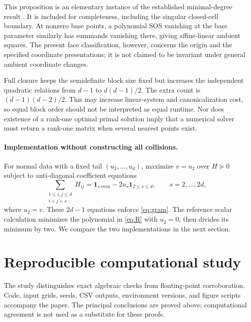 \documentclass[11pt]{article}
\theoremstyle{definition}\newtheorem{definition}[theorem]{Definition}
\theoremstyle{remark}\newtheorem{remark}[theorem]{Remark}
\begin{document}
This proposition is an elementary instance of the established minimal-degree result \cite{bsv,chs}. It is included for completeness, including the singular closed-cell boundary. At nonzero base points, a polynomial SOS vanishing at the base parameter similarly has summands vanishing there, giving affine-linear ambient squares. The present face classification, however, concerns the origin and the specified coordinate presentations; it is not claimed to be invariant under general ambient coordinate changes.

Full closure keeps the semidefinite block size fixed but increases the independent quadratic relations from $d-1$ to $d(d-1)/2$. The extra count is $(d-1)(d-2)/2$. This may increase linear-system and canonicalization cost, so equal block order should not be interpreted as equal runtime. Nor does existence of a rank-one optimal primal solution imply that a numerical solver must return a rank-one matrix when several nearest points exist.

\paragraph{Implementation without constructing all collisions.}
For normal data with a fixed tail $(u_3,\ldots,u_d)$, maximize $v=u_2$ over $H\succeq0$ subject to anti-diagonal coefficient equations
\begin{equation}\label{eq:anti}
 \sum_{\substack{1\le i,j\le d\\i+j=s}}H_{ij}
 =\mathbf1_{s\ \mathrm{even}}-2u_s\mathbf1_{2\le s\le d},\qquad s=2,\ldots,2d,
\end{equation}
where $u_2=v$. These $2d-1$ equations enforce \eqref{eq:gram}. The reference scalar calculation minimizes the polynomial in \eqref{eq:R} with $u_2=0$, then divides its minimum by two. We compare the two implementations in the next section.

\section{Reproducible computational study}\label{sec:experiments}
The study distinguishes exact algebraic checks from floating-point corroboration. Code, input grids, seeds, CSV outputs, environment versions, and figure scripts accompany the paper. The principal conclusions are proved above; computational agreement is not used as a substitute for these proofs.
\end{document}

